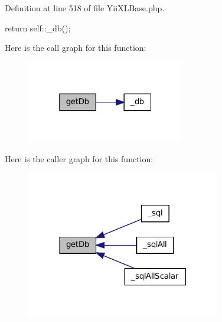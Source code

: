 Definition at line 518 of file YiiXLBase.php.




\begin{DoxyCode}
  {
    return self::_db();
  }
\end{DoxyCode}




Here is the call graph for this function:\nopagebreak
\begin{figure}[H]
\begin{center}
\leavevmode
\includegraphics[width=196pt]{classYiiXLBase_a994ac6292d92ce6c172ee2f655b91ae4_cgraph}
\end{center}
\end{figure}




Here is the caller graph for this function:\nopagebreak
\begin{figure}[H]
\begin{center}
\leavevmode
\includegraphics[width=240pt]{classYiiXLBase_a994ac6292d92ce6c172ee2f655b91ae4_icgraph}
\end{center}
\end{figure}


